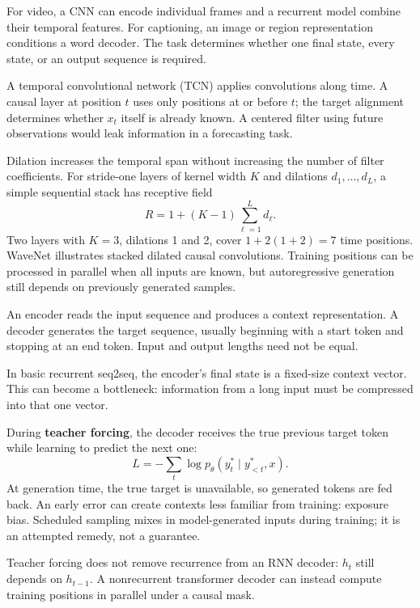 \documentclass[11pt]{article}
\begin{document}
For video, a CNN can encode individual frames and a recurrent model combine their temporal features. For captioning, an image or region representation conditions a word decoder. The task determines whether one final state, every state, or an output sequence is required.

A temporal convolutional network (TCN) applies convolutions along time. A causal layer at position $t$ uses only positions at or before $t$; the target alignment determines whether $x_t$ itself is already known. A centered filter using future observations would leak information in a forecasting task.

Dilation increases the temporal span without increasing the number of filter coefficients. For stride-one layers of kernel width $K$ and dilations $d_1,\ldots,d_L$, a simple sequential stack has receptive field
\[
R=1+(K-1)\sum_{\ell=1}^{L}d_\ell.
\]
Two layers with $K=3$, dilations 1 and 2, cover $1+2(1+2)=7$ time positions. WaveNet illustrates stacked dilated causal convolutions. Training positions can be processed in parallel when all inputs are known, but autoregressive generation still depends on previously generated samples.

An encoder reads the input sequence and produces a context representation. A decoder generates the target sequence, usually beginning with a start token and stopping at an end token. Input and output lengths need not be equal.

In basic recurrent seq2seq, the encoder's final state is a fixed-size context vector. This can become a bottleneck: information from a long input must be compressed into that one vector.

During \textbf{teacher forcing}, the decoder receives the true previous target token while learning to predict the next one:
\[
L=-\sum_t\log p_\theta(y_t^*\mid y_{<t}^*,x).
\]
At generation time, the true target is unavailable, so generated tokens are fed back. An early error can create contexts less familiar from training: exposure bias. Scheduled sampling mixes in model-generated inputs during training; it is an attempted remedy, not a guarantee.

Teacher forcing does not remove recurrence from an RNN decoder: $h_t$ still depends on $h_{t-1}$. A nonrecurrent transformer decoder can instead compute training positions in parallel under a causal mask.
\end{document}

